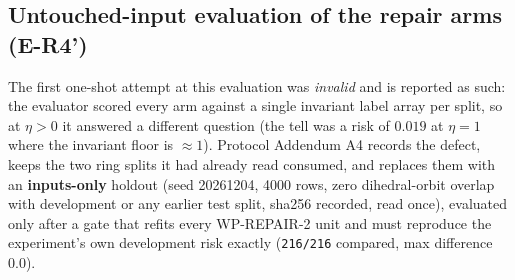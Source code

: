\documentclass{neurips_2024}
\begin{document}
\subsection{Untouched-input evaluation of the repair arms (E-R4')}
\label{sec:er4}

The first one-shot attempt at this evaluation was \emph{invalid} and is reported as such:
the evaluator scored every arm against a single invariant label array per split, so at
$\eta{>}0$ it answered a different question (the tell was a risk of $0.019$ at $\eta{=}1$
where the invariant floor is $\approx1$). Protocol Addendum A4 records the defect, keeps the
two ring splits it had already read consumed, and replaces them with an \textbf{inputs-only}
holdout (seed 20261204, 4000 rows, zero dihedral-orbit overlap with development or any
earlier test split, sha256 recorded, read once), evaluated only after a gate that refits
every WP-REPAIR-2 unit and must reproduce the experiment's own development risk exactly
(\texttt{216/216} compared, max difference $0.0$).
\end{document}
